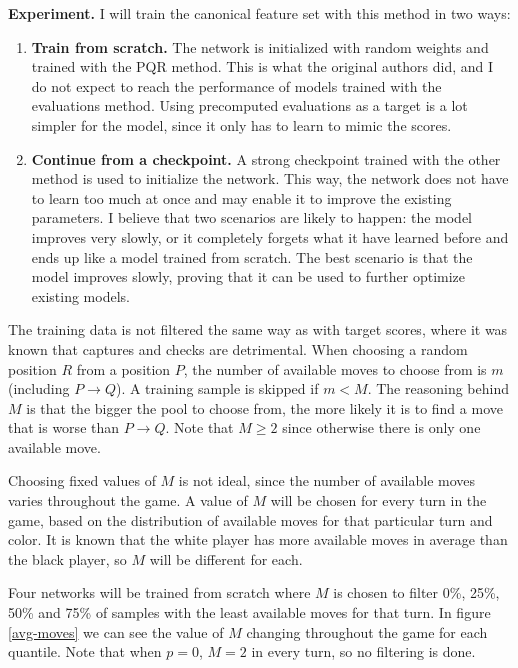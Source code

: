 \newpage
\textbf{Experiment.} I will train the canonical  feature set with this method in two ways:

\begin{enumerate}[label=\bf\Alph*.]
\item \textbf{Train from scratch.} The network is initialized with random weights and trained with the PQR method. This is what the original authors did, and I do not expect to reach the performance of models trained with the evaluations method. Using precomputed evaluations as a target is a lot simpler for the model, since it only has to learn to mimic the scores.

\item \textbf{Continue from a checkpoint.} A strong checkpoint trained with the other method is used to initialize the network. This way, the network does not have to learn too much at once and may enable it to improve the existing parameters. I believe that two scenarios are likely to happen: the model improves very slowly, or it completely forgets what it have learned before and ends up like a model trained from scratch. The best scenario is that the model improves slowly, proving that it can be used to further optimize existing models.
\end{enumerate}

The training data is not filtered the same way as with target scores, where it was known that captures and checks are detrimental. When choosing a random position $R$ from a position $P$, the number of available moves to choose from is $m$ (including $P \rightarrow Q$). A training sample is skipped if $m < M$. The reasoning behind $M$ is that the bigger the pool to choose from, the more likely it is to find a move that is worse than $P \rightarrow Q$. Note that $M \geq 2$ since otherwise there is only one available move.

Choosing fixed values of $M$ is not ideal, since the number of available moves varies throughout the game. A value of $M$ will be chosen for every turn in the game, based on the distribution of available moves for that particular turn and color. It is known that the white player has more available moves in average than the black player, so $M$ will be different for each.

Four networks will be trained from scratch where $M$ is chosen to filter 0\%, 25\%, 50\% and 75\% of samples with the least available moves for that turn. In figure \ref{avg-moves} we can see the value of $M$ changing throughout the game for each quantile. Note that when $p=0$, $M=2$ in every turn, so no filtering is done. \\

